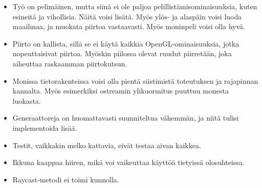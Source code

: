 \documentclass{article}
\begin{document}
\begin{itemize}
    \item Työ on pelimäinen, mutta siinä ei ole paljoa
        pelillistämisominaisuuksia, kuten esineitä ja vihollisia. Näitä voisi
        lisätä. Myös ylös- ja alaspäin voisi luoda maailmaa, ja muokata piirtoa
        vastaavasti. Myös moninpeli voisi olla hyvä.
    \item Piirto on kallista, sillä se ei käytä kaikkia OpenGL-ominaisuuksia,
        jotka nopeuttaisivat piirtoa. Myöskin piilossa olevat ruudut piirretään,
        joka aiheuttaa raskaamman piirtokutsun.
    \item Monissa tietorakenteissa voisi olla pientä siistimistä toteutuksen ja
        rajapinnan kannalta. Myös esimerkiksi ostreamin ylikuormitus puuttuu
        monesta luokasta.
    \item  Generaattoreja on huomattavasti suunniteltua vähemmän, ja niitä
        tulisi implementoida lisää.
    \item Testit, vaikkakin melko kattavia, eivät testaa aivan kaikkea.
    \item Ikkuna kaappaa hiiren, mikä voi vaikeuttaa käyttöä tietyissä
        olosuhteissa.
    \item Raycast-metodi ei toimi kunnolla.
\end{itemize}
\end{document}
